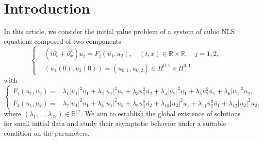 \documentclass[11pt,a4paper,oneside]{amsart}
\theoremstyle{plain}
\theoremstyle{remark}
\numberwithin{equation}{section}
\theoremstyle{definition}
\begin{document}
\maketitle








\section{Introduction}

In this article, we consider the initial value problem of a system of cubic NLS equations composed of two components
\begin{equation}\label{E:generalNLS}
	\left\{
	\begin{aligned}
	&(i  \partial_t + \partial_x^2 )u_j = F_j(u_1,u_2),  \quad (t,x) \in \mathbb{R}\times \mathbb{R}, \quad j=1,2,\\
	&(u_1(0),u_2(0)) = (u_{0,1},u_{0,2}) \in H^{0,1} \times H^{0,1}
	\end{aligned}
	\right.
\end{equation}
with
\begin{equation}\label{E:nonlinearity}
	\left\{
	\begin{aligned}
	F_1(u_1,u_2) ={}& \lambda_1 |u_1|^2 u_1 + \lambda_2 |u_1|^2 u_2 + \lambda_3 u_1^2 \overline{u_2} +
	\lambda_4 |u_2|^2 u_1 + \lambda_5 u_2^2 \overline{u_1} + \lambda_6 |u_2|^2 u_2,\\
	F_2(u_1,u_2)={}& \lambda_7 |u_1|^2 u_1 + \lambda_8 |u_1|^2 u_2 + \lambda_9 u_1^2 \overline{u_2} +
	\lambda_{10} |u_2|^2 u_1 + \lambda_{11} u_2^2 \overline{u_1} + \lambda_{12} |u_2|^2 u_2,
	\end{aligned}
	\right.
\end{equation}
where $(\lambda_1, \dots, \lambda_{12}) \in \mathbb{R}^{12}$.
We aim to establish the global existence of solutions for small initial data and study their asymptotic behavior under a suitable condition on the parameters.
\end{document}

